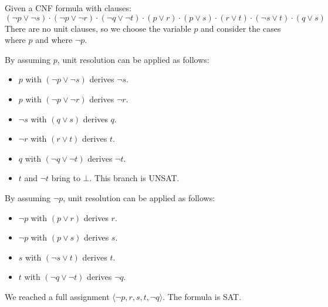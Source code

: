 \begin{example}
    Given a CNF formula with clauses:
    \[ (\lnot p \vee \lnot s) \cdot (\lnot p \vee \lnot r) \cdot (\lnot q \vee \lnot t) \cdot (p \vee r) \cdot (p \vee s) \cdot (r \vee t) \cdot (\lnot s \vee t) \cdot (q \vee s) \]
    There are no unit clauses, so we choose the variable $p$ and consider the cases where $p$ and where $\lnot p$.

    By assuming $p$, unit resolution can be applied as follows:
    \begin{itemize}
        \item $p$ with $(\lnot p \vee \lnot s)$ derives $\lnot s$.
        \item $p$ with $(\lnot p \vee \lnot r)$ derives $\lnot r$.
        \item $\lnot s$ with $(q \vee s)$ derives $q$.
        \item $\lnot r$ with $(r \vee t)$ derives $t$.
        \item $q$ with $(\lnot q \vee \lnot t)$ derives $\lnot t$.
        \item $t$ and $\lnot t$ bring to $\bot$. This branch is UNSAT.
    \end{itemize}

    By assuming $\lnot p$, unit resolution can be applied as follows:
    \begin{itemize}
        \item $\lnot p$ with $(p \vee r)$ derives $r$.
        \item $\lnot p$ with $(p \vee s)$ derives $s$.
        \item $s$ with $(\lnot s \vee t)$ derives $t$.
        \item $t$ with $(\lnot q \vee \lnot t)$ derives $\lnot q$.
    \end{itemize}
    We reached a full assignment $\langle \lnot p, r, s, t, \lnot q \rangle$. The formula is SAT.
\end{example}

